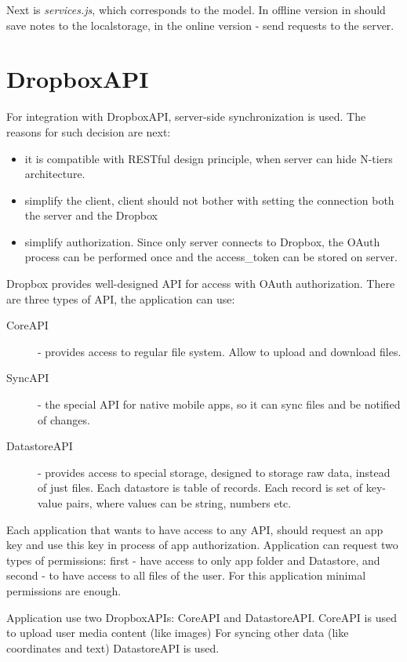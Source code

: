 \documentclass[12pt,a4paper]{article}
\begin{document}
Next is \textit{services.js}, which corresponds to the model. In offline version
in should save notes to the localstorage, in the online version - send requests
to the server.

\section{DropboxAPI}
For integration with DropboxAPI, server-side synchronization is used. The reasons
for such decision are next:

\begin{itemize}
    \item it is compatible with RESTful design principle, when server can hide N-tiers architecture.
    \item simplify the client, client should not bother with setting the connection both the
server and the Dropbox
    \item simplify authorization. Since only server connects to Dropbox, the OAuth process can
be performed once and the access\_token can be stored on server.
\end{itemize}

Dropbox provides well-designed API for access with OAuth authorization.
There are three types of API, the application can use:

\begin{description}
    \item[CoreAPI] - provides access to regular file system. Allow to upload and download files.

    \item[SyncAPI] - the special API for native mobile apps, so it can sync files
        and be notified of changes.

    \item[DatastoreAPI] - provides access to special storage, designed to storage
        raw data, instead of just files. Each datastore is table of records. Each record
        is set of key-value pairs, where values can be string, numbers etc.
\end{description}

Each application that wants to have access to any API, should request an app key and
use this key in process of app authorization. Application can request two types of permissions:
first - have access to only app folder and Datastore, and second - to have access to
all files of the user.
For this application minimal permissions are enough.

Application use two DropboxAPIs: CoreAPI and DatastoreAPI.
CoreAPI is used to upload user media content (like images)
For syncing other data (like coordinates and text) DatastoreAPI is used.
\end{document}
